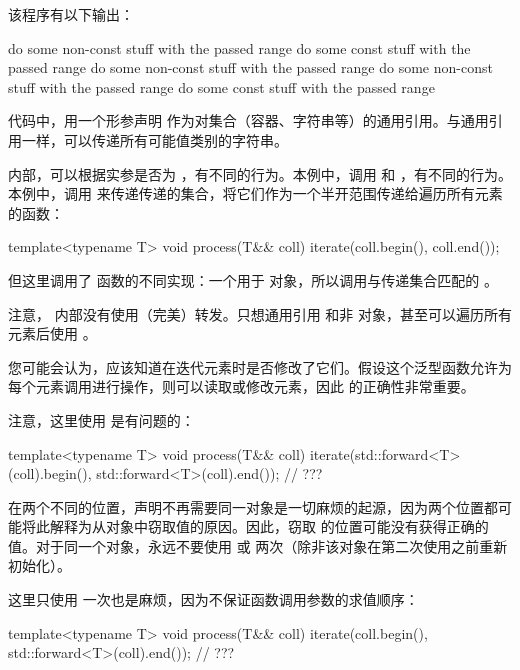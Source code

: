 该程序有以下输出：

\begin{outputcode}
do some non-const stuff with the passed range
do some const stuff with the passed range
do some non-const stuff with the passed range
do some non-const stuff with the passed range
do some const stuff with the passed range
\end{outputcode}

代码中，用一个形参声明  作为对集合（容器、字符串等）的通用引用。与通用引用一样，可以传递所有可能值类别的字符串。

 内部，可以根据实参是否为 ，有不同的行为。本例中，调用  和 ，有不同的行为。本例中，调用  来传递传递的集合，将它们作为一个半开范围传递给遍历所有元素的函数：

\begin{cppcode}
template<typename T>
void process(T&& coll)
{
	iterate(coll.begin(), coll.end());
}
\end{cppcode}

但这里调用了  函数的不同实现：一个用于  对象，所以调用与传递集合匹配的 。

注意， 内部没有使用（完美）转发。只想通用引用  和非  对象，甚至可以遍历所有元素后使用 。

您可能会认为，应该知道在迭代元素时是否修改了它们。假设这个泛型函数允许为每个元素调用进行操作，则可以读取或修改元素，因此  的正确性非常重要。

注意，这里使用  是有问题的：

\begin{cppcode}
template<typename T>
void process(T&& coll)
{
	iterate(std::forward<T>(coll).begin(), std::forward<T>(coll).end()); // ???
}
\end{cppcode}

在两个不同的位置，声明不再需要同一对象是一切麻烦的起源，因为两个位置都可能将此解释为从对象中窃取值的原因。因此，窃取  的位置可能没有获得正确的值。对于同一个对象，永远不要使用  或  两次（除非该对象在第二次使用之前重新初始化）。

这里只使用  一次也是麻烦，因为不保证函数调用参数的求值顺序：

\begin{cppcode}
template<typename T>
void process(T&& coll)
{
	iterate(coll.begin(), std::forward<T>(coll).end()); // ???
}
\end{cppcode}

